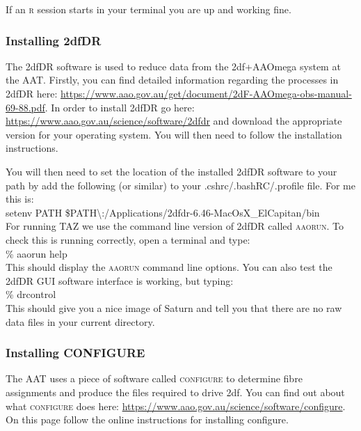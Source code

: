\documentclass[12pt]{article}
\begin{document}
If an \textsc{r} session starts in your terminal you are up and working fine.

\subsubsection{Installing 2dfDR}

The 2dfDR software is used to reduce data from the 2df+AAOmega system at the AAT. Firstly, you can find detailed information regarding the processes in 2dfDR here:  \url{https://www.aao.gov.au/get/document/2dF-AAOmega-obs-manual-69-88.pdf}. In order to install 2dfDR go here: \url{https://www.aao.gov.au/science/software/2dfdr} and download the appropriate version for your operating system. You will then need to follow the installation instructions.

You will then need to set the location of the installed 2dfDR software to your path by add the following (or similar) to your .cshrc/.bashRC/.profile file. For me this is: \\


\hspace{10mm} setenv PATH \$PATH\textbackslash:/Applications/2dfdr-6.46-MacOsX\_ElCapitan/bin \\

For running \textsc{TAZ} we use the command line version of 2dfDR called \textsc{aaorun}. To check this is running correctly, open a terminal and type: \\

\hspace{10mm} \% aaorun help\\

This should display the  \textsc{aaorun} command line options. You can also test the 2dfDR GUI software interface is working, but typing: \\

 
\hspace{10mm} \% drcontrol\\

This should give you a nice image of Saturn and tell you that there are no raw data files in your current directory.

\subsubsection{Installing CONFIGURE}

The AAT uses a piece of software called \textsc{configure} to determine fibre assignments and produce the files required to drive 2df. You can find out about what \textsc{configure} does here: \url{https://www.aao.gov.au/science/software/configure}. On this page follow the online instructions for installing configure.  \\
\end{document}
